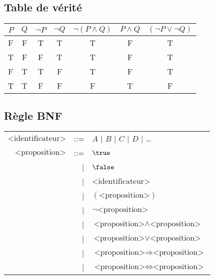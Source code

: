 \subsection*{Table de vérité}
\begin{center}
	\begin{tabular}{cc|ccccc}
		$P$ & $Q$ & $\lnot P$ & $\lnot Q$ & $\lnot( P \land Q)$ & $P \land Q$ & $ (\lnot P \lor \lnot Q)$\\
		\hline
		F&F&T&T&T&F&T\\
		T&F&F&T&T&F&T\\
		F&T&T&F&T&F&T\\
		T&T&F&F&F&T&F\\
	\end{tabular}
\end{center}

\subsection*{Règle BNF}
\begin{tabular}{rrl}
  $\textrm{<identificateur>}$ & ::= & $A$ | $B$ | $C$ | $D$ | \dots \\
  $\textrm{<proposition>}$
  & ::= & $\true$ \\
  & | & $\false$ \\
  & | & $\textrm{<identificateur>}$ \\
  & | & $(\textrm{<proposition>})$ \\
  & | & $\lnot \textrm{<proposition>}$ \\
  & | & $\textrm{<proposition>} \land \textrm{<proposition>}$ \\
  & | & $\textrm{<proposition>} \lor \textrm{<proposition>}$ \\
  & | & $\textrm{<proposition>} \Rightarrow \textrm{<proposition>}$ \\
  & | & $\textrm{<proposition>} \Leftrightarrow \textrm{<proposition>}$
\end{tabular}



